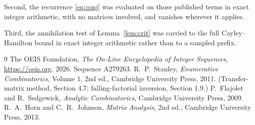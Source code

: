 \documentclass[11pt,a4paper]{article}
\theoremstyle{plain}
\theoremstyle{definition}
\begin{document}
Second, the recurrence \eqref{eq:conj} was evaluated on those published terms in exact
integer arithmetic, with no matrices involved, and vanishes wherever it applies.

Third, the annihilation test of Lemma~\ref{lem:crit} was carried to the full
Cayley--Hamilton bound in exact integer arithmetic rather than to a sampled prefix.

\begin{thebibliography}{9}
 The OEIS Foundation, \emph{The On-Line Encyclopedia of Integer
Sequences}, \url{https://oeis.org}, 2026. Sequence A279263.
 R.~P.~Stanley, \emph{Enumerative Combinatorics}, Volume 1, 2nd ed.,
Cambridge University Press, 2011. (Transfer-matrix method, Section 4.7; falling-factorial
inversion, Section 1.9.)
 P.~Flajolet and R.~Sedgewick, \emph{Analytic Combinatorics}, Cambridge
University Press, 2009.
 R.~A.~Horn and C.~R.~Johnson, \emph{Matrix Analysis}, 2nd ed., Cambridge
University Press, 2013.
\end{thebibliography}
\end{document}
